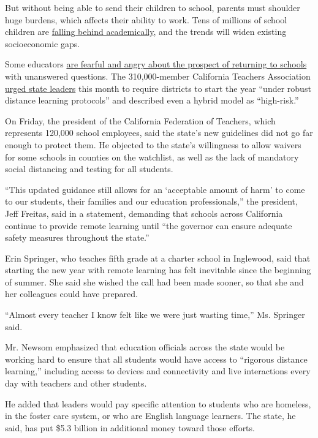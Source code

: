 But without being able to send their children to school, parents must
shoulder huge burdens, which affects their ability to work. Tens of
millions of school children are
\href{https://www.nytimes3xbfgragh.onion/2020/06/05/us/coronavirus-education-lost-learning.html}{falling
behind academically}, and the trends will widen existing socioeconomic
gaps.

Some educators
\href{https://www.nytimes3xbfgragh.onion/2020/07/11/us/virus-teachers-classrooms.html}{are
fearful and angry about the prospect of returning to schools} with
unanswered questions. The 310,000-member California Teachers Association
\href{https://aarjb2jw4n53e35fhbquj418-wpengine.netdna-ssl.com/wp-content/uploads/2020/07/CTA-Elected-Leaders-COVID-Letter-7.8.20.pdf}{urged
state leaders} this month to require districts to start the year ``under
robust distance learning protocols'' and described even a hybrid model
as ``high-risk.''

On Friday, the president of the California Federation of Teachers, which
represents 120,000 school employees, said the state's new guidelines did
not go far enough to protect them. He objected to the state's
willingness to allow waivers for some schools in counties on the
watchlist, as well as the lack of mandatory social distancing and
testing for all students.

``This updated guidance still allows for an `acceptable amount of harm'
to come to our students, their families and our education
professionals,'' the president, Jeff Freitas, said in a statement,
demanding that schools across California continue to provide remote
learning until ``the governor can ensure adequate safety measures
throughout the state.''

Erin Springer, who teaches fifth grade at a charter school in Inglewood,
said that starting the new year with remote learning has felt inevitable
since the beginning of summer. She said she wished the call had been
made sooner, so that she and her colleagues could have prepared.

``Almost every teacher I know felt like we were just wasting time,'' Ms.
Springer said.

Mr. Newsom emphasized that education officials across the state would be
working hard to ensure that all students would have access to ``rigorous
distance learning,'' including access to devices and connectivity and
live interactions every day with teachers and other students.

He added that leaders would pay specific attention to students who are
homeless, in the foster care system, or who are English language
learners. The state, he said, has put \$5.3 billion in additional money
toward those efforts.

